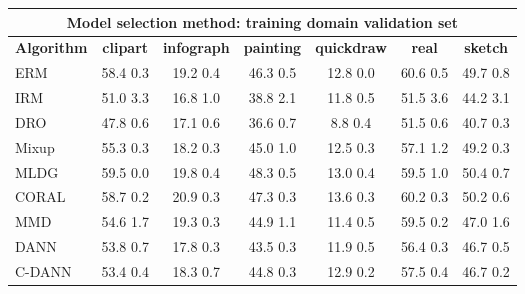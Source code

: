 \documentclass{article}
\begin{document}
\begin{center}
\begin{tabular}{lcccccc}
\toprule
\multicolumn{7}{c}{\textbf{Model selection method: training domain validation set}} \\
\midrule
\textbf{Algorithm}    & \textbf{clipart} & \textbf{infograph} & \textbf{painting} & \textbf{quickdraw} & \textbf{real} & \textbf{sketch}     \\
\midrule
ERM          &    58.4  0.3 &  19.2  0.4 &  46.3  0.5 & 12.8  0.0 & 60.6  0.5 & 49.7  0.8 \\            
IRM          &    51.0  3.3 &  16.8  1.0 &  38.8  2.1 & 11.8  0.5 & 51.5  3.6 & 44.2  3.1 \\            
DRO    &    47.8  0.6 &  17.1  0.6 &  36.6  0.7 & 8.8  0.4  & 51.5  0.6 & 40.7  0.3 \\            
Mixup        &    55.3  0.3 &  18.2  0.3 &  45.0  1.0 & 12.5  0.3 & 57.1  1.2 & 49.2  0.3 \\            
MLDG         &    59.5  0.0 &  19.8  0.4 &  48.3  0.5 & 13.0  0.4 & 59.5  1.0 & 50.4  0.7 \\            
CORAL        &    58.7  0.2 &  20.9  0.3 &  47.3  0.3 & 13.6  0.3 & 60.2  0.3 & 50.2  0.6 \\            
MMD          &    54.6  1.7 &  19.3  0.3 &  44.9  1.1 & 11.4  0.5 & 59.5  0.2 & 47.0  1.6 \\            
DANN          &    53.8  0.7 &  17.8  0.3 &  43.5  0.3 & 11.9  0.5 & 56.4  0.3 & 46.7  0.5 \\            
C-DANN      &    53.4  0.4 &  18.3  0.7 &  44.8  0.3 & 12.9  0.2 & 57.5  0.4 & 46.7  0.2 \\            
\bottomrule
\end{tabular}
\end{center}
\end{document}
